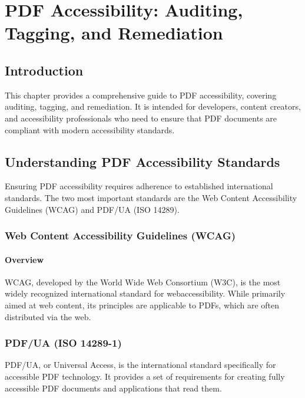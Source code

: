 \chapter{PDF Accessibility: Auditing, Tagging, and Remediation}
\label{chap:pdf-accessibility-report}

\section{Introduction}
\label{sec:pdf-report-introduction}
This chapter provides a comprehensive guide to PDF accessibility, covering auditing, tagging, and remediation. It is intended for developers, content creators, and accessibility professionals who need to ensure that PDF documents are compliant with modern accessibility standards.

\section{Understanding PDF Accessibility Standards}
\label{sec:pdf-accessibility-standards}
Ensuring PDF accessibility requires adherence to established international standards. The two most important standards are the Web Content Accessibility Guidelines (WCAG) and PDF/UA (ISO 14289).

\subsection{Web Content Accessibility Guidelines (WCAG)}
\label{subsec:wcag-pdf}

\subsubsection{Overview}
\label{ssubsec:wcag-pdf-overview}
\gls{WCAG}, developed by the World Wide Web Consortium (W3C), is the most widely recognized international standard for \gls{webaccessibility}. While primarily aimed at web content, its principles are applicable to PDFs, which are often distributed via the web.

\subsection{PDF/UA (ISO 14289-1)}
\label{subsec:pdf-ua}
PDF/UA, or Universal Access, is the international standard specifically for accessible PDF technology. It provides a set of requirements for creating fully accessible PDF documents and applications that read them.

